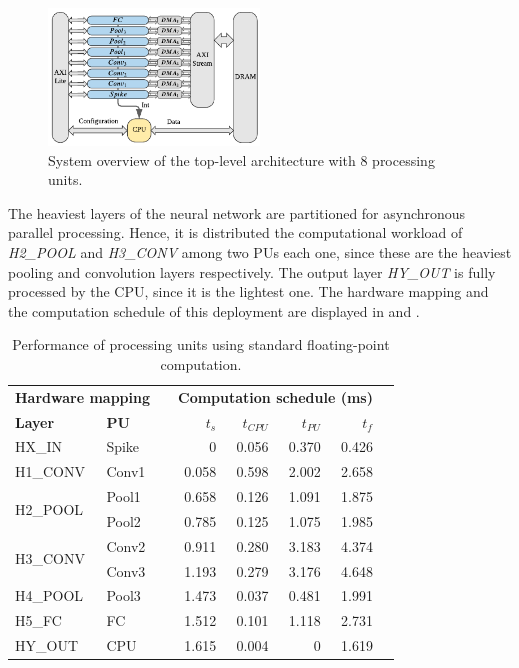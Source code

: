 \begin{figure}[h!]
	\centering
	\includegraphics[width=0.5\textwidth]{../figures/sbs_hw_experimental.pdf}
	\caption{System overview of the top-level architecture with 8 processing units.}
	\label{fig:hw_sbs_8_pu}
\end{figure}

The heaviest layers of the neural network are partitioned for asynchronous parallel processing. Hence, it is distributed the computational workload of \emph{H2\_POOL} and \emph{H3\_CONV} among two PUs each one, since these are the heaviest pooling and convolution layers respectively. The output layer \emph{HY\_OUT} is fully processed by the CPU, since it is the lightest one. The hardware mapping and the computation schedule of this deployment are displayed in  and .

\begin{table}[!t]\centering
	\caption{Performance of processing units using standard floating-point computation.}\label{tab:latency_fp}
	\scriptsize
	\begin{tabular}{llrrrrrr}\toprule
		\multicolumn{2}{c}{\textbf{Hardware mapping}} & &\multicolumn{4}{c}{\textbf{Computation schedule (ms)}} \\\cmidrule{1-2}\cmidrule{4-7}
		\textbf{Layer} &\textbf{PU} & &$t_s$ &$t_{CPU}$ &$t_{PU}$ &$t_f$ \\\midrule
		HX\_IN &Spike & &0 &0.056 &0.370 &0.426 \\
		H1\_CONV &Conv1 & &0.058 &0.598 &2.002 &2.658 \\
		\multirow{2}{*}{H2\_POOL}
		&Pool1 & &0.658 &0.126 &1.091 &1.875 \\
		&Pool2 & &0.785 &0.125 &1.075 &1.985 \\
		\multirow{2}{*}{H3\_CONV} 
		&Conv2 & &0.911 &0.280 &3.183 &4.374 \\
		&Conv3 & &1.193 &0.279 &3.176 &4.648 \\
		H4\_POOL &Pool3 & &1.473 &0.037 &0.481 &1.991 \\
		H5\_FC &FC & &1.512 &0.101 &1.118 &2.731 \\
		HY\_OUT &CPU & &1.615 &0.004 &0 &1.619 \\
		\bottomrule
	\end{tabular}
\end{table}

